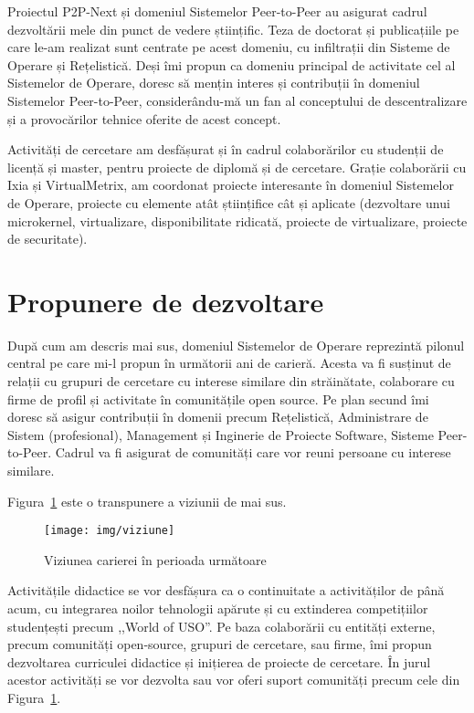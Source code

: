 \documentclass[11pt,a4paper]{article}
\begin{document}
Proiectul P2P-Next și domeniul Sistemelor Peer-to-Peer au asigurat cadrul
dezvoltării mele din punct de vedere științific. Teza de doctorat și
publicațiile pe care le-am realizat sunt centrate pe acest domeniu, cu
infiltrații din Sisteme de Operare și Rețelistică. Deși îmi propun ca domeniu
principal de activitate cel al Sistemelor de Operare, doresc să mențin
interes și contribuții în domeniul Sistemelor Peer-to-Peer, considerându-mă un
fan al conceptului de descentralizare și a provocărilor tehnice oferite de
acest concept.

Activități de cercetare am desfășurat și în cadrul colaborărilor cu studenții
de licență și master, pentru proiecte de diplomă și de cercetare. Grație
colaborării cu Ixia și VirtualMetrix, am coordonat proiecte interesante în
domeniul Sistemelor de Operare, proiecte cu elemente atât științifice cât și
aplicate (dezvoltare unui microkernel, virtualizare, disponibilitate ridicată,
proiecte de virtualizare, proiecte de securitate).

\section*{Propunere de dezvoltare}

După cum am descris mai sus, domeniul Sistemelor de Operare reprezintă pilonul
central pe care mi-l propun în următorii ani de carieră. Acesta va fi susținut
de relații cu grupuri de cercetare cu interese similare din străinătate,
colaborare cu firme de profil și activitate în comunitățile open source. Pe
plan secund îmi doresc să asigur contribuții în domenii precum Rețelistică,
Administrare de Sistem (profesional), Management și Inginerie de Proiecte
Software, Sisteme Peer-to-Peer. Cadrul va fi asigurat de comunități care vor
reuni persoane cu interese similare.

Figura~\ref{fig:viziune} este o transpunere a viziunii de mai sus.

\begin{figure}[h]
  \begin{center}
    \texttt{[image: img/viziune]}
  \end{center}
  \caption{Viziunea carierei în perioada următoare}
  \label{fig:viziune}
\end{figure}

Activitățile didactice se vor desfășura ca o continuitate a activităților de
până acum, cu integrarea noilor tehnologii apărute și cu extinderea
competițiilor studențești precum ,,World of USO''. Pe baza colaborării cu
entități externe, precum comunități open-source, grupuri de cercetare, sau
firme, îmi propun dezvoltarea curriculei didactice și inițierea de proiecte de
cercetare. În jurul acestor activități se vor dezvolta sau vor oferi suport
comunități precum cele din Figura~\ref{fig:viziune}.
\end{document}
